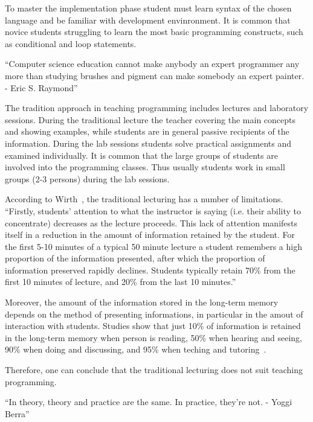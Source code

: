 \documentclass{article}
\begin{document}
To master the implementation phase student must learn syntax of the
chosen language and be familiar with development envinronment. It is
common that novice students struggling to learn the most basic
programming constructs, such as conditional and loop statements.



``Computer science education cannot make anybody an expert programmer any
more than studying brushes and pigment can make somebody an expert painter. -
Eric S. Raymond'' 



The tradition approach in teaching programming includes lectures and
laboratory sessions.  During the traditional lecture the teacher
covering the main concepts and showing examples, while students are in
general passive recipients of the information. During the lab sessions
students solve practical assignments and examined individually. It is
common that the large groups of students are involved into the
programming classes. Thus usually students work in small groups (2-3
persons) during the lab sessions. 

According to Wirth~\cite{wirth}, the traditional lecturing has a
number of limitations.  ``Firstly, students’ attention to what the
instructor is saying (i.e. their ability to concentrate) decreases as
the lecture proceeds. This lack of attention manifests itself in a
reduction in the amount of information retained by the student. For
the first 5-10 minutes of a typical 50 minute lecture a student
remembers a high proportion of the information presented, after which
the proportion of information preserved rapidly declines. Students
typically retain 70\% from the first 10 minutes of lecture, and 20\%
from the last 10 minutes.''

Moreover, the amount of the information stored in the long-term memory
depends on the method of presenting informations, in particular in the
amout of interaction with students.  Studies show that just 10\% of
information  is retained in the long-term memory when person is
reading, 50\% when hearing and seeing, 90\% when doing and discussing,
and 95\% when teching and tutoring~\cite{magnesen}.

Therefore, one can conclude that the traditional lecturing does not
suit teaching programming.


``In theory, theory and practice are the same. In practice,
they’re not. - Yoggi Berra'' 
\end{document}
